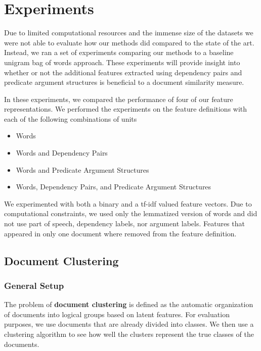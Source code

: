 \documentclass[11pt]{article}
\newcommand{\bt}[1]{\textbf{#1}}
\begin{document}
\section{Experiments}

\newcommand{\headcol}{\rowcolor{tableheadcolor}} %


Due to limited computational resources and the immense size of the datasets we were not able to evaluate how our methods did compared to the state of the art. Instead, we ran a set of experiments comparing our methods to a baseline unigram bag of words approach. These experiments will provide insight into whether or not the additional features extracted using dependency pairs and predicate argument structures is beneficial to a document similarity measure. 

In these experiments, we compared the performance of four of our feature representations. We performed the experiments on the feature definitions with each of the following combinations of units

\begin{itemize}
\item Words
\item Words and Dependency Pairs 
\item Words and Predicate Argument Structures
\item Words, Dependency Pairs, and Predicate Argument Structures
\end{itemize}

We experimented with both a binary and a tf-idf valued feature vectors. Due to computational constraints, we used only the lemmatized version of words and did not use part of speech, dependency labels, nor argument labels. Features that appeared in only one document where removed from the feature definition.


\subsection{Document Clustering} \label{sec:DocumentClusterting}

\subsubsection{General Setup}

The problem of \bt{document clustering} is defined as the automatic organization of documents into logical groups based on latent features. For evaluation purposes, we use documents that are already divided into classes. We then use a clustering algorithm to see how well the clusters represent the true classes of the documents. 
\end{document}
